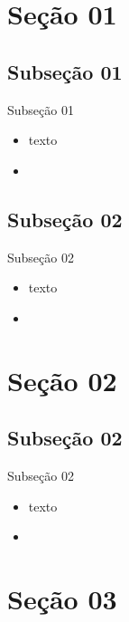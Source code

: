 \documentclass[aspectratio=169, 9pt]{beamer}
\begin{document}
\section{Seção 01}

\subsection[]{Subseção 01}

\begin{frame}{Subseção 01}
	\begin{itemize}[<+->]
		\item texto
		\item 
	\end{itemize}
\end{frame}


\subsection[]{Subseção 02}

\begin{frame}{Subseção 02}
	\begin{itemize}[<+->]
		\item texto
		\item 
	\end{itemize}
\end{frame}



\section{Seção 02}

\subsection[]{Subseção 02}

\begin{frame}{Subseção 02}
	\begin{itemize}[<+->]
		\item texto
		\item 
	\end{itemize}
\end{frame}



\section{Seção 03}
\end{document}
